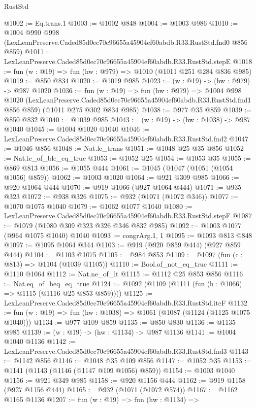 \begin{lexlean}{RustStd}
\begin{coremodule}
@1002 := Eq.trans.{1}
@1003 := @1002 @848
@1004 := @1003 @986
@1010 := @1004
    @990
    @998
    (LexLeanPreserve.Caded85d0ec70c96655a45904ef60abdb.R33.RustStd.fnd0 @856 @859)
@1011 := LexLeanPreserve.Caded85d0ec70c96655a45904ef60abdb.R33.RustStd.stepE
@1018 := fun (w : @19) => fun (hw : @979) => @1010 (@1011 @251 @284 @836 @985)
@1019 := @850 @834
@1020 := @1019 @985
@1023 := (w : @19) -> (hw : @979) -> @987 @1020
@1036 := fun (w : @19) =>
  fun (hw : @979) =>
  @1004
    @998
    @1020
    (LexLeanPreserve.Caded85d0ec70c96655a45904ef60abdb.R33.RustStd.fnd1 @856 @859)
    (@1011 @275 @302 @834 @985)
@1038 := @977 @35 @859
@1039 := @850 @832
@1040 := @1039 @985
@1043 := (w : @19) -> (hw : @1038) -> @987 @1040
@1045 := @1004 @1020 @1040
@1046 := LexLeanPreserve.Caded85d0ec70c96655a45904ef60abdb.R33.RustStd.fnd2
@1047 := @1046 @856
@1048 := Nat.le_trans
@1051 := @1048 @25 @35 @856
@1052 := Nat.le_of_ble_eq_true
@1053 := @1052 @25
@1054 := @1053 @35
@1055 := @869 @813
@1056 := @1055 @444
@1061 := @1045 (@1047 (@1051 (@1054 @1056) @859))
@1062 := @1003 @1020
@1064 := @921 @309 @985
@1066 := @920 @1064 @444
@1070 := @919 @1066 (@927 @1064 @444)
@1071 := @935 @323
@1072 := @938 @326
@1075 := @932 (@1071 (@1072 @346))
@1077 := @1070 @1075 @1040
@1079 := @1062 @1077 @1040
@1080 := LexLeanPreserve.Caded85d0ec70c96655a45904ef60abdb.R33.RustStd.stepF
@1087 := @1079 (@1080 @309 @323 @326 @346 @832 @985)
@1092 := @1003 @1077 (@964 @1075 @1040) @1040
@1093 := congrArg.{1, 1}
@1095 := @1093 @813 @848
@1097 := @1095 @1064 @344
@1103 := @919 (@920 @859 @444) (@927 @859 @444)
@1104 := @1103 @1075
@1105 := @984 @853
@1109 := @1097 (fun (c : @813) => @1104 (@1039 @1105))
@1110 := Bool.of_not_eq_true
@1111 := @1110 @1064
@1112 := Nat.ne_of_lt
@1115 := @1112 @25 @853 @856
@1116 := Nat.eq_of_beq_eq_true
@1124 := @1092 (@1109 (@1111 (fun (h : @1066) => @1115 (@1116 @25 @853 @859))))
@1125 := LexLeanPreserve.Caded85d0ec70c96655a45904ef60abdb.R33.RustStd.iteF
@1132 := fun (w : @19) => fun (hw : @1038) => @1061 (@1087 (@1124 (@1125 @1075 @1040)))
@1134 := @977 @109 @859
@1135 := @850 @830
@1136 := @1135 @985
@1139 := (w : @19) -> (hw : @1134) -> @987 @1136
@1141 := @1004 @1040 @1136
@1142 := LexLeanPreserve.Caded85d0ec70c96655a45904ef60abdb.R33.RustStd.fnd3
@1143 := @1142 @856
@1146 := @1048 @35 @109 @856
@1147 := @1052 @35
@1153 := @1141 (@1143 (@1146 (@1147 @109 @1056) @859))
@1154 := @1003 @1040
@1156 := @921 @349 @985
@1158 := @920 @1156 @444
@1162 := @919 @1158 (@927 @1156 @444)
@1165 := @932 (@1071 (@1072 @574))
@1167 := @1162 @1165 @1136
@1207 := fun (w : @19) =>
  fun (hw : @1134) =>

\end{coremodule}
\end{lexlean}
